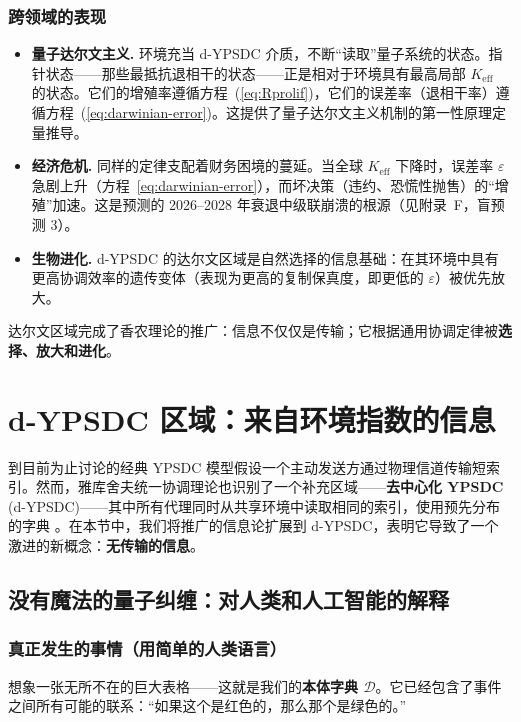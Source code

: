 \documentclass[12pt,a4paper]{article}
\theoremstyle{remark}
\begin{document}
	\subsubsection*{跨领域的表现}
	\begin{itemize}[leftmargin=*]
		\item \textbf{量子达尔文主义.} 环境充当 d-YPSDC 介质，不断“读取”量子系统的状态。指针状态——那些最抵抗退相干的状态——正是相对于环境具有最高局部 \(K_{\mathrm{eff}}\) 的状态。它们的增殖率遵循方程~(\ref{eq:Rprolif})，它们的误差率（退相干率）遵循方程~(\ref{eq:darwinian-error})。这提供了量子达尔文主义机制的第一性原理定量推导。
		\item \textbf{经济危机.} 同样的定律支配着财务困境的蔓延。当全球 \(K_{\mathrm{eff}}\) 下降时，误差率 \(\varepsilon\) 急剧上升（方程~\ref{eq:darwinian-error}），而坏决策（违约、恐慌性抛售）的“增殖”加速。这是预测的 2026–2028 年衰退中级联崩溃的根源（见附录~F，盲预测 3）。
		\item \textbf{生物进化.} d-YPSDC 的达尔文区域是自然选择的信息基础：在其环境中具有更高协调效率的遗传变体（表现为更高的复制保真度，即更低的 \(\varepsilon\)）被优先放大。
	\end{itemize}
	
	达尔文区域完成了香农理论的推广：信息不仅仅是传输；它根据通用协调定律被\textbf{选择、放大和进化}。
	
	\section{d-YPSDC 区域：来自环境指数的信息}
	\label{sec:d-ypsdc-info}
	
	到目前为止讨论的经典 YPSDC 模型假设一个主动发送方通过物理信道传输短索引。然而，雅库舍夫统一协调理论也识别了一个补充区域——\textbf{去中心化 YPSDC} (d-YPSDC)——其中所有代理同时从共享环境中读取相同的索引，使用预先分布的字典 \cite{Appendix_dYPSDC}。在本节中，我们将推广的信息论扩展到 d-YPSDC，表明它导致了一个激进的新概念：\textbf{无传输的信息}。
	
	\subsection{没有魔法的量子纠缠：对人类和人工智能的解释}
	
	\subsubsection{真正发生的事情（用简单的人类语言）}
	
	想象一张无所不在的巨大表格——这就是我们的\textbf{本体字典 \(\mathcal{D}\)}。它已经包含了事件之间所有可能的联系：“如果这个是红色的，那么那个是绿色的。”
	
\end{document}
